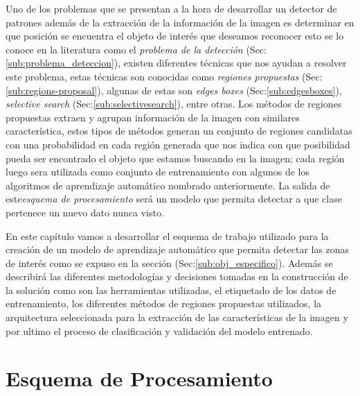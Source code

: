Uno de los problemas que se presentan a la hora de desarrollar un detector de patrones además de la extracción de la información de la imagen es determinar en que posición se encuentra el objeto de interés que deseamos reconocer esto se lo conoce en la literatura como el \textit{problema de la detección} (Sec:\ref{sub:problema_deteccion}), existen diferentes técnicas que nos ayudan a resolver este problema, estas técnicas son conocidas como \textit{regiones propuestas} (Sec:\ref{sub:regions-proposal}), algunas de estas son \textit{edges boxes} (Sec:\ref{sub:edgesboxes}), \textit{selective search} (Sec:\ref{sub:selectivesearch}), entre otras. Los métodos de regiones propuestas extraen y agrupan información de la imagen con similares característica, estos tipos de métodos generan un conjunto de regiones candidatas con una probabilidad en cada región generada que nos indica con que posibilidad pueda ser encontrado el objeto que estamos buscando en la imagen; cada región luego sera utilizada como conjunto de entrenamiento con algunos de los algoritmos de aprendizaje automático nombrado anteriormente. La salida de este\textit{esquema de procesamiento} será un modelo que permita detectar a que clase pertenece un nuevo dato nunca visto.

En este capítulo vamos a desarrollar el esquema de trabajo utilizado para la creación de un modelo de aprendizaje automático que permita detectar las zonas de interés como se expuso en la sección (Sec:\ref{sub:obj_especifico}). Además se describirá las diferentes metodologías y decisiones tomadas en la construcción de la solución como son las herramientas utilizadas, el etiquetado de los datos de entrenamiento, los diferentes  métodos de regiones propuestas utilizados, la arquitectura seleccionada para la extracción de las características de la imagen y por ultimo el proceso de clasificación y validación del modelo entrenado.




%


\section{Esquema de Procesamiento}\label{sec: pipeline}

